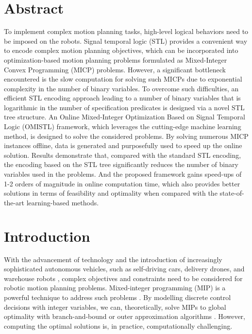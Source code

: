 \documentclass[a4paper]{report}
\begin{document}
\chapter*{Abstract}
To implement complex motion planning tasks, high-level logical behaviors need to be imposed on the robots. Signal temporal logic (STL) provides a convenient way to encode complex motion planning objectives, which can be incorporated into optimization-based motion planning problems formulated as Mixed-Integer Convex Programming (MICP) problems. However, a significant bottleneck encountered is the slow computation for solving such MICPs due to exponential complexity in the number of binary variables. To overcome such difficulties, an efficient STL encoding approach leading to a number of binary variables that is logarithmic in the number of specification predicates is designed via a novel STL tree structure. An Online Mixed-Integer Optimization Based on Signal Temporal Logic (OMISTL) framework, which leverages the cutting-edge machine learning method, is designed to solve the considered problems. By solving numerous MICP instances offline, data is generated and purposefully used to speed up the online solution. Results demonstrate that, compared with the standard STL encoding, the encoding based on the STL tree significantly reduces the number of binary variables used in the problems. And the proposed framework gains speed-ups of 1-2 orders of magnitude in online computation time, which also provides better solutions in terms of feasibility and optimality when compared with the state-of-the-art learning-based methods.


\tableofcontents

\chapter{Introduction}
With the advancement of technology and the introduction of increasingly sophisticated autonomous vehicles, such as self-driving cars, delivery drones, and warehouse robots \cite[]{mou2018optimal}\cite[]{sawadsitang2018supplier}\cite[]{liu2022integer}, complex objectives and constraints need to be considered for robotic motion planning problems. Mixed-integer programming (MIP) is a powerful technique to address such problems \cite[]{booth2016mixed}\cite[]{landry2016aggressive}. By modelling discrete control decisions with integer variables, we can, theoretically, solve MIPs to global optimality with branch-and-bound or outer approximation algorithms \cite[]{lee2011mixed}. However, computing the optimal solutions is, in practice, computationally challenging.
\end{document}
